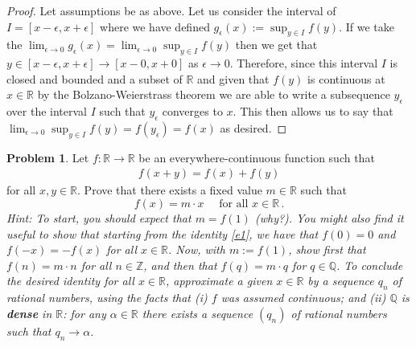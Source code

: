 \documentclass[11pt]{article}
\theoremstyle{definition}
\newtheorem{problem}{Problem}
\newcommand{\R}{\mathbb{R}}
\newcommand{\Z}{\mathbb{Z}}
\newcommand{\Q}{\mathbb{Q}}
\begin{document}
\begin{proof}
Let assumptions be as above. Let us consider the interval of $I = [x-\epsilon, x + \epsilon]$ where we have defined $g_\epsilon(x) := \sup_{y\in I}f(y).$ If we take the $\lim_{\epsilon \to 0}g_\epsilon(x) = \lim_{\epsilon \to 0}\sup_{y\in I}f(y)$ then we get that $y\in [x-\epsilon, x + \epsilon] \to [x-0, x+0]$ as $\epsilon \to 0$. Therefore, since this interval $I$ is closed and bounded and a subset of $\R$ and given that $f(y)$ is continuous at $x\in \R$ by the Bolzano-Weierstrass theorem we are able to write a subsequence $y_\epsilon$ over the interval $I$ such that $y_\epsilon$ converges to $x$. This then allows us to say that $\lim_{\epsilon \to 0}\sup_{y\in I}f(y) = f(y_\epsilon) = f(x)$ as desired.
\end{proof}

\newpage
\begin{problem}
Let $f : \R \to \R$ be an everywhere-continuous function such that
\begin{align}\label{e1}
f(x + y) = f(x) + f(y)
\end{align}
for all $x, y \in \R$. Prove that there exists a fixed value $m \in \R$ such that
\[
f(x) = m \cdot x \quad \text{ for all } x \in \R \,. 
\]
{\it Hint: To start, you should expect that $m = f(1)$ (why?). You might also find it useful to show that starting from the identity \eqref{e1}, we have that $f(0) = 0$ and $f(-x) = - f(x)$ for all $x \in \R$. Now, with $m := f(1)$, show first that $f(n) = m \cdot n$ for all $n \in \Z$, and then that $f(q) = m \cdot q$ for $q \in \Q$. To conclude the desired identity for all $x \in \R$, approximate a given $x \in \R$ by a sequence $q_n$ of rational numbers, using the facts that (i) $f$ was assumed continuous; and (ii) $\Q$ is {\bf dense} in $\R$: for any $\alpha \in \R$ there exists a sequence $(q_n)$ of rational numbers such that $q_n \to \alpha$. }
\end{problem}
\end{document}
